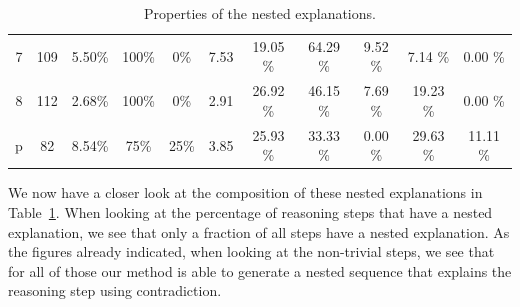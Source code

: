 \begin{table}
\begin{tabular}{c|c|ccc|c|ccccc}
		7          & 109                & 5.50\%             & 100\%                                              & 0\%                   & 7.53                                                                   & 19.05 \%      & 64.29 \%        & 9.52 \%       & 7.14 \%            & 0.00 \%      \\
		8          & 112                & 2.68\%             & 100\%                                              & 0\%                   & 2.91                                                                   & 26.92 \%      & 46.15 \%        & 7.69 \%       & 19.23 \%           & 0.00 \%      \\
		p          & 82                 & 8.54\%             & 75\%                                               & 25\%                  & 3.85                                                                   & 25.93 \%      & 33.33 \%        & 0.00 \%       & 29.63 \%           & 11.11 \%
	\end{tabular}
	\caption{Properties of the nested explanations.}

	\label{table:nested_explanation}

\end{table}

We now have a closer look at the composition of these nested explanations in Table~\ref{table:nested_explanation}.
When looking at the percentage of reasoning steps that have a nested explanation, we see that only a fraction of all steps have a nested explanation. As the figures already indicated, when looking at the non-trivial steps, we see that for all of those our method is able to generate a nested sequence that explains the reasoning step using contradiction.


